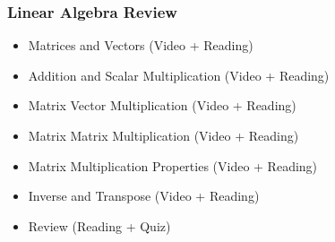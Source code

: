 \newpage

\subsubsection*{Linear Algebra Review}
\begin{itemize}
  \item Matrices and Vectors (Video + Reading)
  \item Addition and Scalar Multiplication (Video + Reading)
  \item Matrix Vector Multiplication (Video + Reading)
  \item Matrix Matrix Multiplication (Video + Reading)
  \item Matrix Multiplication Properties (Video + Reading)
  \item Inverse and Transpose (Video + Reading)
  \item Review (Reading + Quiz)
\end{itemize}
